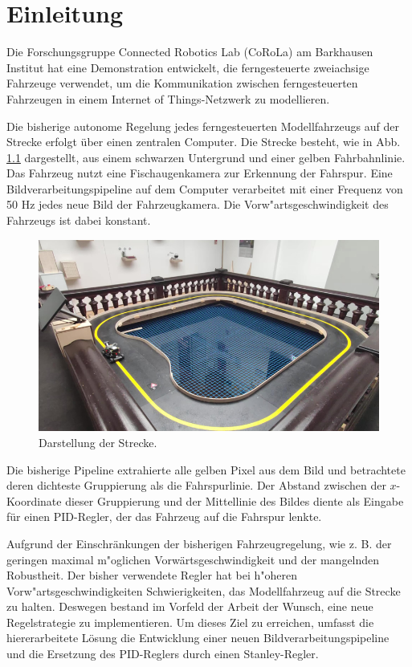 \documentclass[arbeit=studie,oneside,BCOR=12mm]{ArbeitRST}
\begin{document}
\tableofcontents
{}

\chapter{Einleitung}

Die Forschungsgruppe Connected Robotics Lab (CoRoLa) am Barkhausen Institut hat
eine Demonstration entwickelt, die ferngesteuerte zweiachsige Fahrzeuge
verwendet, um die Kommunikation zwischen ferngesteuerten Fahrzeugen in einem
\glqq Internet of Things\grqq-Netzwerk zu modellieren.

Die bisherige autonome Regelung jedes ferngesteuerten Modellfahrzeugs auf der
Strecke erfolgt über einen zentralen Computer. Die Strecke besteht, wie in Abb.
\ref{track_and_car} dargestellt, aus einem schwarzen Untergrund und einer
gelben Fahrbahnlinie. 
Das Fahrzeug nutzt eine Fischaugenkamera zur Erkennung der Fahrspur. Eine
Bildverarbeitungspipeline auf dem Computer verarbeitet mit einer Frequenz von
50 Hz jedes neue Bild der Fahrzeugkamera. Die Vorw"artsgeschwindigkeit des
Fahrzeugs ist dabei konstant. 

\begin{figure}[h]
    \centering
    \includegraphics[scale=0.48]{track_and_car}
    \caption{Darstellung der Strecke.}
    \label{track_and_car}
\end{figure}

Die bisherige Pipeline extrahierte alle gelben
Pixel aus dem Bild und betrachtete deren dichteste Gruppierung als die
Fahrspurlinie. Der Abstand zwischen der $x$-Koordinate dieser Gruppierung und
der Mittellinie des Bildes diente als Eingabe für einen PID-Regler, der das
Fahrzeug auf die Fahrspur lenkte. 

Aufgrund der Einschränkungen der bisherigen Fahrzeugregelung, wie z. B. der
geringen maximal m"oglichen Vorwärtsgeschwindigkeit und der mangelnden
Robustheit. Der bisher verwendete Regler hat bei h"oheren Vorw"artsgeschwindigkeiten
Schwierigkeiten, das Modellfahrzeug auf die Strecke zu halten. Deswegen bestand im
Vorfeld der Arbeit der Wunsch, eine neue Regelstrategie
zu implementieren. Um dieses Ziel zu erreichen, umfasst die hiererarbeitete
Lösung die Entwicklung einer neuen Bildverarbeitungspipeline und die Ersetzung des
PID-Reglers durch einen Stanley-Regler.
\end{document}

